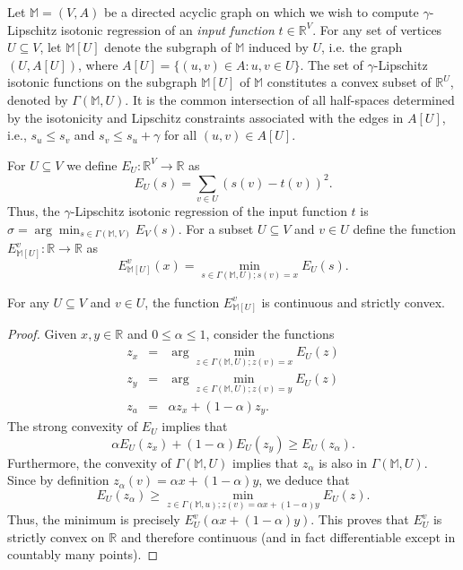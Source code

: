 \documentclass[11pt]{article}
\def\MM{\mathbb{M}}
\renewcommand{\b}[1]{\ensuremath{\mathbb{#1}}}
\begin{document}
Let $\MM = (V, A)$ be a directed acyclic graph on which we wish to compute $\gamma$-Lipschitz isotonic regression of an {\em input function} $t \in \mathbb{R}^V$. For any set of vertices $U \subseteq V$, let $\MM[U]$ denote the subgraph of $\MM$ induced by $U$, i.e. the graph $(U, A[U])$, where $A[U] = \{(u, v) \in A: u, v \in U\}$.  The set of $\gamma$-Lipschitz isotonic functions on the subgraph $\MM[U]$ of $\MM$ constitutes
a convex subset of $\mathbb{R}^U$, denoted by $\Gamma(\MM,U)$.  It is the common intersection of all half-spaces determined by the isotonicity and Lipschitz constraints associated 
with the edges in $A[U]$, i.e., $s_u \le s_v$ and $s_v \le s_u+\gamma$ 
for all $(u,v) \in A[U]$.  

For $U \subseteq V$ we define $E_U : \mathbb{R}^V \to \mathbb{R}$ as 
\[
E_U(s) =  \sum_{v \in U} (s(v) - t(v))^2.
\]
Thus, the $\gamma$-Lipschitz isotonic regression of the input function $t$ is $\sigma = \arg\min_{s \in \Gamma(\MM,V)} E_V(s)$.  For a subset $U \subseteq V$ and $v \in U$ define the function $E_{\MM[U]}^v: \mathbb{R} \rightarrow \mathbb{R}$ as 
\[
E_{\MM[U]}^v(x) = \min_{s \in \Gamma(\MM,U); s(v) = x} E_U(s).
\]


\begin{lemma}\label{lem:convex-general}
For any $U \subseteq V$ and $v \in U$, the function $E_{\MM[U]}^v$ is continuous and strictly convex. 
\end{lemma}
\begin{proof}Given $x, y \in \b{R}$ and $0 \leq \alpha \leq 1$, consider the functions 
\begin{eqnarray*}
z_x &=& \arg \min_{z \in \Gamma(\MM,U); z(v) = x} E_U(z)
\\
z_y &=& \arg \min_{z \in \Gamma(\MM,U); z(v) = y} E_U(z) 
\\
z_a &=& \alpha z_x + (1-\alpha) z_y.
\end{eqnarray*}
The strong convexity of $E_U$ implies that 
$$ 
\alpha E_U(z_x) + (1-\alpha) E_U(z_y) \geq E_U(z_\alpha).
$$
Furthermore, the convexity of $\Gamma(\MM,U)$ implies that $z_\alpha$ is also in $\Gamma(\MM,U)$.  Since by definition $z_\alpha(v) = \alpha x + (1-\alpha) y$, we deduce that 
$$
E_U(z_\alpha) \geq \min_{z \in \Gamma(\MM,u); z(v) = \alpha x + (1-\alpha)y} E_U(z).
$$
Thus, the minimum is precisely $E_U^v(\alpha x + (1-\alpha) y)$. 
This proves that $E_U^v$ is strictly convex on $\mathbb{R}$ and therefore continuous (and in fact differentiable except in countably many points).
\end{proof}
\end{document}
